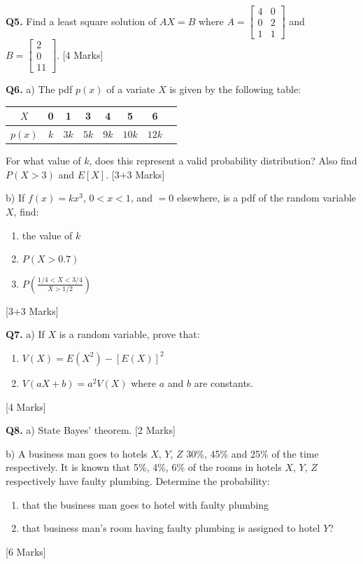 \documentclass[11pt,a4paper]{article}
\begin{document}
\textbf{Q5.} Find a least square solution of $AX = B$ where $A = \begin{bmatrix} 4 & 0 \\ 0 & 2 \\ 1 & 1 \end{bmatrix}$ and $B = \begin{bmatrix} 2 \\ 0 \\ 11 \end{bmatrix}$. \hfill [4 Marks]

\textbf{Q6.} a) The pdf $p(x)$ of a variate $X$ is given by the following table:

\begin{center}
\begin{tabular}{|c|c|c|c|c|c|c|c|}
\hline
$X$ & 0 & 1 & 3 & 4 & 5 & 6 \\
\hline
$p(x)$ & $k$ & $3k$ & $5k$ & $9k$ & $10k$ & $12k$ \\
\hline
\end{tabular}
\end{center}

For what value of $k$, does this represent a valid probability distribution? Also find $P(X > 3)$ and $E[X]$. \hfill [3+3 Marks]

b) If $f(x) = kx^3$, $0 < x < 1$, and $= 0$ elsewhere, is a pdf of the random variable $X$, find:
\begin{enumerate}[label=(\roman*)]
\item the value of $k$
\item $P(X > 0.7)$
\item $P\left(\frac{1/4 < X < 3/4}{X > 1/2}\right)$
\end{enumerate} \hfill [3+3 Marks]

\textbf{Q7.} a) If $X$ is a random variable, prove that:
\begin{enumerate}[label=(\roman*)]
\item $V(X) = E(X^2) - [E(X)]^2$
\item $V(aX + b) = a^2 V(X)$ where $a$ and $b$ are constants.
\end{enumerate} \hfill [4 Marks]

\textbf{Q8.} a) State Bayes' theorem. \hfill [2 Marks]

b) A business man goes to hotels $X$, $Y$, $Z$ 30\%, 45\% and 25\% of the time respectively. It is known that 5\%, 4\%, 6\% of the rooms in hotels $X$, $Y$, $Z$ respectively have faulty plumbing. Determine the probability:
\begin{enumerate}[label=(\roman*)]
\item that the business man goes to hotel with faulty plumbing
\item that business man's room having faulty plumbing is assigned to hotel $Y$?
\end{enumerate} \hfill [6 Marks]
\end{document}

